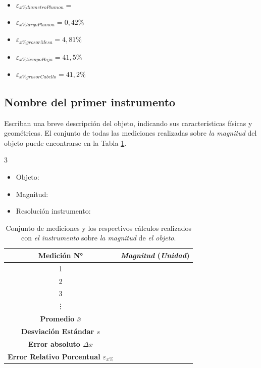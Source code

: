 \documentclass[12pt,a4paper]{article}
\begin{document}
\begin{itemize}
\item $\varepsilon_{x\%diametroPlumon}= $
\item $\varepsilon_{x\%largoPlumon}= 0,42\%$
\item $\varepsilon_{x\%grosorMesa}= 4,81\%$
\item $\varepsilon_{x\%tiempoHoja}= 41,5\%$
\item $\varepsilon_{x\%grosorCabello}= 41,2\%$
\end{itemize}


\subsection{Nombre del primer instrumento}

Escriban una breve descripción del objeto, indicando sus características físicas y geométricas. El conjunto de todas las mediciones realizadas sobre \textit{la magnitud} del objeto puede encontrarse en la Tabla \ref{mediciones-inst-1}.

\begin{multicols}{3}
\begin{itemize}
    \item Objeto:
    \item Magnitud:
    \item Resolución instrumento:
\end{itemize}
\end{multicols}

\begin{table}[h!]
\centering
\begin{tabular}{|c|c|}
\hline
\textbf{Medición N°} & \textit{Magnitud} \textbf{(}\textit{Unidad}\textbf{)} \\ \hline
1 & \\ \hline
2 & \\ \hline
3 & \\ \hline
\vdots & \\ \hline
\textbf{Promedio $\bar{x}$} & \\ \hline
\textbf{Desviación Estándar $s$} & \\ \hline
\textbf{Error absoluto $\Delta x$} & \\ \hline
\textbf{Error Relativo Porcentual $\varepsilon_{x\%}$} & \\ \hline
\end{tabular}
\caption{Conjunto de mediciones y los respectivos cálculos realizados con \textit{el instrumento} sobre \textit{la magnitud} de \textit{el objeto}.}
\label{mediciones-inst-1}
\end{table}
\end{document}
